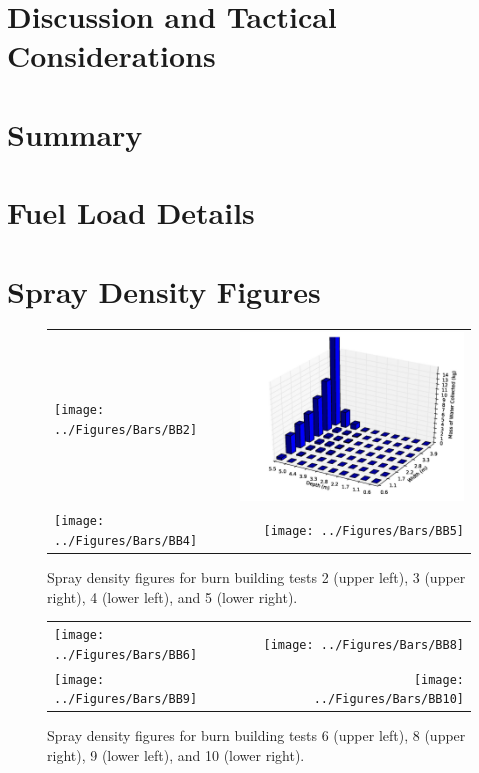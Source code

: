 \documentclass[12pt,oneside]{book}
\begin{document}
\chapter{Discussion and Tactical Considerations}
\label{chap:Discussion_and_Tactical_Considerations}

\chapter{Summary}
\label{chap:Summary}



\appendix

\chapter{Fuel Load Details}
\label{app:fuel_loads}


\chapter{Spray Density Figures}
\label{app:spray_density}

\begin{figure}[ht]
\begin{tabular*}{\textwidth}{lr}
\texttt{[image: ../Figures/Bars/BB2]} &
\includegraphics[width=3.2in]{../Figures/Bars/BB3} \\
\texttt{[image: ../Figures/Bars/BB4]} &
\texttt{[image: ../Figures/Bars/BB5]}
\end{tabular*}
\caption{Spray density figures for burn building tests 2 (upper left), 3 (upper right), 4 (lower left), and 5 (lower right).}
\label{fig:bb_2_5}
\end{figure}

\clearpage

\begin{figure}[ht]
\begin{tabular*}{\textwidth}{lr}
\texttt{[image: ../Figures/Bars/BB6]} &
\texttt{[image: ../Figures/Bars/BB8]} \\
\texttt{[image: ../Figures/Bars/BB9]} &
\texttt{[image: ../Figures/Bars/BB10]}
\end{tabular*}
\caption{Spray density figures for burn building tests 6 (upper left), 8 (upper right), 9 (lower left), and 10 (lower right).}
\label{fig:bb_6_10}
\end{figure}
\end{document}
